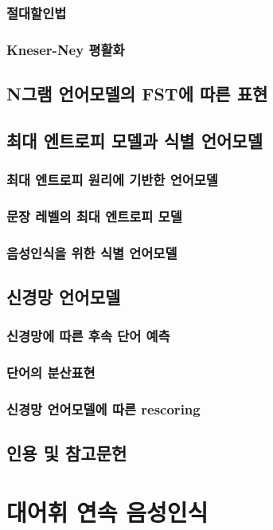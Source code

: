\documentclass{book}
\begin{document}
\subsection{절대할인법}
\subsection{Kneser-Ney 평활화}

\section{N그램 언어모델의 FST에 따른 표현}
\label{sec:N-gram-FST}
\section{최대 엔트로피 모델과 식별 언어모델}
\subsection{최대 엔트로피 원리에 기반한 언어모델}
\subsection{문장 레벨의 최대 엔트로피 모델}
\subsection{음성인식을 위한 식별 언어모델}

\section{신경망 언어모델}
\subsection{신경망에 따른 후속 단어 예측}
\subsection{단어의 분산표현}
\subsection{신경망 언어모델에 따른 rescoring}

\section*{인용 및 참고문헌}

\chapter{대어휘 연속 음성인식}
\end{document}
